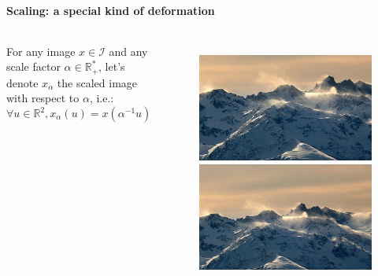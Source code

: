 \documentclass[10pt]{beamer}
\newcommand{\mathR}{\mathbb{R}}
\newcommand{\MI}{{\mathcal I}}
\begin{document}
\begin{darkframes}
    
    \begin{frame}[label=scal]{\subsecname}
    \framesubtitle{Scaling: a special kind of deformation}
    \begin{columns}
            For any image $x \in \MI$ and any scale factor $\alpha \in \mathR_+^*$, let's denote $x_{\alpha}$ the scaled image with respect to $\alpha$, i.e.:
            $$\forall u \in \mathR^2, x_{\alpha}(u) = x(\alpha^{-1}u)$$
            \begin{figure}
            \centering
            \includegraphics[height=0.3\textheight]{resources/25639-9_1.jpg}
            \vspace{0.01\textheight}
            \includegraphics[height=0.3\textheight]{resources/25639-9_3.jpg}
            \end{figure}
    \end{columns}
    \end{frame}
    


\end{darkframes}
\end{document}
